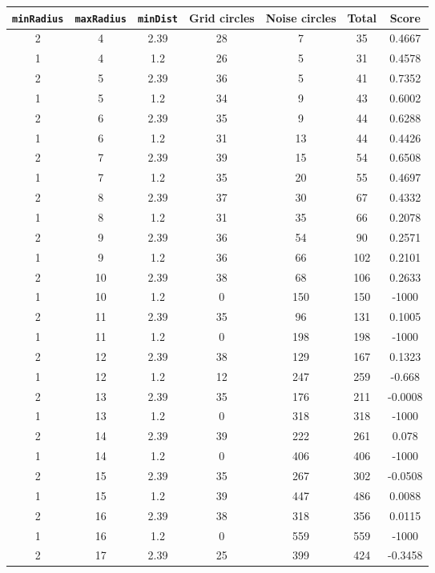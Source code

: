 \documentclass[letterpaper, 12pt]{article}
\begin{document}
\begin{longtable}{|c|c|c|c|c|c|c|}
\hline
\textbf{\texttt{minRadius}} & \textbf{\texttt{maxRadius}} & \textbf{\texttt{minDist}} & \textbf{Grid circles} & \textbf{Noise circles} & \textbf{Total} & \textbf{Score} \\
\hline
2 & 4 & 2.39 & 28 & 7 & 35 & 0.4667 \\
\hline
1 & 4 & 1.2 & 26 & 5 & 31 & 0.4578 \\
\hline
2 & 5 & 2.39 & 36 & 5 & 41 & 0.7352 \\
\hline
1 & 5 & 1.2 & 34 & 9 & 43 & 0.6002 \\
\hline
2 & 6 & 2.39 & 35 & 9 & 44 & 0.6288 \\
\hline
1 & 6 & 1.2 & 31 & 13 & 44 & 0.4426 \\
\hline
2 & 7 & 2.39 & 39 & 15 & 54 & 0.6508 \\
\hline
1 & 7 & 1.2 & 35 & 20 & 55 & 0.4697 \\
\hline
2 & 8 & 2.39 & 37 & 30 & 67 & 0.4332 \\
\hline
1 & 8 & 1.2 & 31 & 35 & 66 & 0.2078 \\
\hline
2 & 9 & 2.39 & 36 & 54 & 90 & 0.2571 \\
\hline
1 & 9 & 1.2 & 36 & 66 & 102 & 0.2101 \\
\hline
2 & 10 & 2.39 & 38 & 68 & 106 & 0.2633 \\
\hline
1 & 10 & 1.2 & 0 & 150 & 150 & -1000 \\
\hline
2 & 11 & 2.39 & 35 & 96 & 131 & 0.1005 \\
\hline
1 & 11 & 1.2 & 0 & 198 & 198 & -1000 \\
\hline
2 & 12 & 2.39 & 38 & 129 & 167 & 0.1323 \\
\hline
1 & 12 & 1.2 & 12 & 247 & 259 & -0.668 \\
\hline
2 & 13 & 2.39 & 35 & 176 & 211 & -0.0008 \\
\hline
1 & 13 & 1.2 & 0 & 318 & 318 & -1000 \\
\hline
2 & 14 & 2.39 & 39 & 222 & 261 & 0.078 \\
\hline
1 & 14 & 1.2 & 0 & 406 & 406 & -1000 \\
\hline
2 & 15 & 2.39 & 35 & 267 & 302 & -0.0508 \\
\hline
1 & 15 & 1.2 & 39 & 447 & 486 & 0.0088 \\
\hline
2 & 16 & 2.39 & 38 & 318 & 356 & 0.0115 \\
\hline
1 & 16 & 1.2 & 0 & 559 & 559 & -1000 \\
\hline
2 & 17 & 2.39 & 25 & 399 & 424 & -0.3458 \\

\end{longtable}
\end{document}
